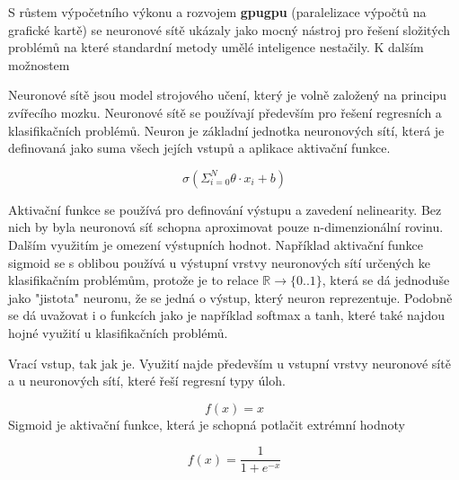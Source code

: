S růstem výpočetního výkonu a rozvojem \textbf{gpugpu} (paralelizace výpočtů na grafické kartě) se neuronové sítě ukázaly jako mocný nástroj pro řešení složitých problémů na které standardní metody umělé inteligence nestačily.
K dalším možnostem 




Neuronové sítě jsou model strojového učení, který je volně založený na principu zvířecího mozku.  \cite[s.~41]{fundementalsOfDeepLearning}
Neuronové sítě se používají především pro řešení regresních a klasifikačních problémů.
Neuron je základní jednotka neuronových sítí, která je definovaná jako suma všech jejích vstupů a aplikace aktivační funkce.

	$$\sigma(\Sigma_{i=0}^{N} \theta \cdot x_{i} + b)$$

Aktivační funkce se používá pro definování výstupu a zavedení nelinearity. Bez nich by byla neuronová síť schopna aproximovat pouze n-dimenzionální rovinu. \cite[s.~65]{fundementalsOfDeepLearning} \\
Dalším využitím je omezení výstupních hodnot. Například aktivační funkce sigmoid se s oblibou používá u výstupní vrstvy neuronových sítí určených ke klasifikačním problémům, protože je to relace $\mathbb{R} \rightarrow \{0..1\}$, která se dá jednoduše jako "jistota" neuronu, že se jedná o výstup, který neuron reprezentuje. Podobně se dá uvažovat i o funkcích jako je například softmax a tanh, které také najdou hojné využití u klasifikačních problémů.

Vrací vstup, tak jak je. Využití najde především u vstupní vrstvy neuronové sítě a u neuronových sítí, které řeší regresní typy úloh.
\\
$$f(x) = x$$
Sigmoid je aktivační funkce, která je schopná potlačit extrémní hodnoty 

$$f(x) = \frac{1}{1 + e^{-x}}$$

